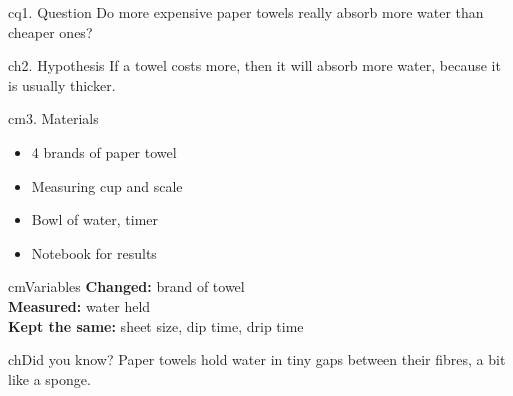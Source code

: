 \documentclass{article}
\begin{document}
\begin{minipage}[t]{0.29\linewidth}
  \vspace{0pt}
  \begin{card}{cq}{1. Question}
    Do more expensive paper towels really absorb more water than cheaper ones?
  \end{card}
  \begin{card}{ch}{2. Hypothesis}
    If a towel costs more, then it will absorb more water, because it is usually thicker.
  \end{card}
  \begin{card}{cm}{3. Materials}
    \begin{itemize}
      \item 4 brands of paper towel
      \item Measuring cup and scale
      \item Bowl of water, timer
      \item Notebook for results
    \end{itemize}
  \end{card}
  \begin{card}{cm}{Variables}
    \textbf{Changed:} brand of towel\\
    \textbf{Measured:} water held\\
    \textbf{Kept the same:} sheet size, dip time, drip time
  \end{card}
  \begin{card}{ch}{Did you know?}
    Paper towels hold water in tiny gaps between their fibres, a bit like a sponge.
  \end{card}
\end{minipage}\hfill
\end{document}
